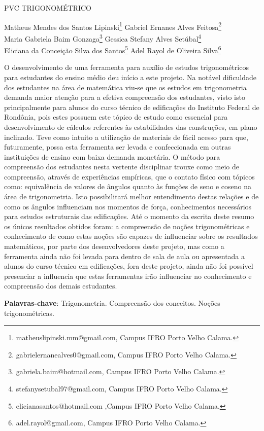 \documentclass[article,12pt,onesidea,4paper,english,brazil]{abntex2}
\begin{document}
	
	
	\frenchspacing 
	
	\begin{center}
		\LARGE PVC TRIGONOMÉTRICO
		
		\normalsize
		Matheus Mendes dos Santos Lipinski\footnote{matheuslipinski.mm@gmail.com, Campus IFRO Porto Velho Calama.}  
		Gabriel Ernanes Alves Feitosa\footnote{gabrielernanealves0@gmail.com, Campus IFRO Porto Velho Calama.}\\
		Maria Gabriela Baim Gonzaga\footnote{gabriela.baim@hotmail.com, Campus IFRO Porto Velho Calama.}
		Gessica Stefany Alves Setúbal\footnote{stefanysetubal97@gmail.com, Campus IFRO Porto Velho Calama.}\\
		Eliciana da Conceição Silva dos Santos\footnote{elicianasantos@hotmail.com ,Campus IFRO Porto Velho Calama.}
		Adel Rayol de Oliveira Silva\footnote{adel.rayol@gmail.com, Campus IFRO Porto Velho Calama.}

	\end{center}
	
	\noindent O desenvolvimento de uma ferramenta para auxílio de estudos trigonométricos para estudantes do ensino médio deu início a este projeto. Na notável dificuldade dos estudantes na área de matemática viu-se que os estudos em trigonometria demanda maior atenção para a efetiva compreensão dos estudantes, visto isto principalmente para alunos do curso técnico de edificações do Instituto Federal de Rondônia, pois estes possuem este tópico de estudo como essencial para desenvolvimento de cálculos referentes às estabilidades das construções, em plano inclinado. Teve como intuito a utilização de materiais de fácil acesso para que, futuramente, possa esta ferramenta ser levada e confeccionada em outras instituições de ensino com baixa demanda monetária.  O método para compreensão dos estudantes nesta vertente disciplinar trouxe como meio de compreensão, através de experiências empíricas, que o contato físico com tópicos como: equivalência de valores de ângulos quanto às funções de seno e coseno na área de trigonometria. Isto possibilitará melhor entendimento destas relações e de como os ângulos influenciam nos momentos de força, conhecimentos necessários para estudos estruturais das edificações. Até o momento da escrita deste resumo os únicos resultados obtidos foram: a compreensão de noções trigonométricas e conhecimento de como estas noções são capazes de influenciar sobre os resultados matemáticos, por parte dos desenvolvedores deste projeto, mas como a ferramenta ainda não foi levada para dentro de sala de aula ou apresentada a alunos do curso técnico em edificações, fora deste projeto, ainda não foi possível presenciar a influencia que estas ferramentas irão influenciar no conhecimento e compreensão dos demais estudantes.
	
	\vspace{\onelineskip}
	
	\noindent
	\textbf{Palavras-chave}: Trigonometria. Compreensão dos conceitos. Noções trigonométricas.
	
\end{document}
